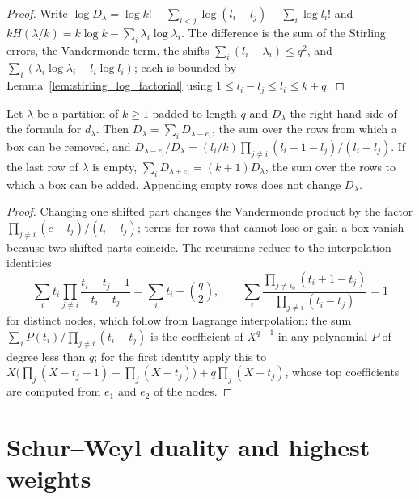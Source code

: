 \begin{proof}\leanok
    Write $\log D_\lambda=\log k!+\sum_{i<j}\log(l_i-l_j)-\sum_i\log l_i!$ and
    $kH(\lambda/k)=k\log k-\sum_i\lambda_i\log\lambda_i$. The difference is the
    sum of the Stirling errors, the Vandermonde term, the shifts
    $\sum_i(l_i-\lambda_i)\le q^2$, and $\sum_i(\lambda_i\log\lambda_i-l_i\log l_i)$;
    each is bounded by Lemma~\ref{lem:stirling_log_factorial} using
    $1\le l_i-l_j\le l_i\le k+q$.
\end{proof}

\begin{lemma}
    \label{lem:hook_recursions}
    \leanok
    Let $\lambda$ be a partition of $k\ge1$ padded to length $q$ and $D_\lambda$ the
    right-hand side of the formula for $d_\lambda$. Then
    $D_\lambda=\sum_iD_{\lambda-e_i}$, the sum over the rows from which a box can be
    removed, and $D_{\lambda-e_i}/D_\lambda=(l_i/k)\prod_{j\ne i}(l_i-1-l_j)/(l_i-l_j)$.
    If the last row of $\lambda$ is empty, $\sum_iD_{\lambda+e_i}=(k+1)D_\lambda$, the
    sum over the rows to which a box can be added. Appending empty rows does not
    change $D_\lambda$.
\end{lemma}

\begin{proof}\leanok
    Changing one shifted part changes the Vandermonde product by the factor
    $\prod_{j\ne i}(c-l_j)/(l_i-l_j)$; terms for rows that cannot lose or gain a box
    vanish because two shifted parts coincide. The recursions reduce to the
    interpolation identities
    \[
        \sum_i t_i\prod_{j\ne i}\frac{t_i-t_j-1}{t_i-t_j}=\sum_it_i-\binom q2,
        \qquad
        \sum_i\frac{\prod_{j\ne i_0}(t_i+1-t_j)}{\prod_{j\ne i}(t_i-t_j)}=1
    \]
    for distinct nodes, which follow from Lagrange interpolation: the sum
    $\sum_iP(t_i)/\prod_{j\ne i}(t_i-t_j)$ is the coefficient of $X^{q-1}$ in any
    polynomial $P$ of degree less than $q$; for the first identity apply this to
    $X\bigl(\prod_j(X-t_j-1)-\prod_j(X-t_j)\bigr)+q\prod_j(X-t_j)$, whose top
    coefficients are computed from $e_1$ and $e_2$ of the nodes.
\end{proof}

\section{Schur--Weyl duality and highest weights}

